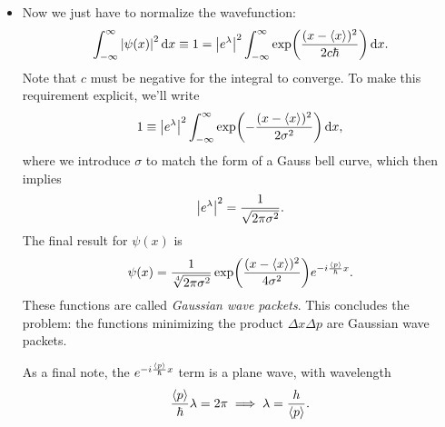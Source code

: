 \documentclass[11pt, a4paper]{article}
\newcommand{\diff}{\mathop{}\!\mathrm{d}} %
\begin{document}
\begin{itemize}
	\item Now we just have to normalize the wavefunction:
	\begin{equation*}
		\int_{-\infty}^{\infty} \abs{\psi(x)}^{2} \diff x \equiv 1 = \abs{e^{\lambda}}^{2} \int_{-\infty}^{\infty}\exp(\frac{(x - \ev{x})^{2}}{2c\hbar})\diff x.
	\end{equation*}
	Note that $ c $ must be negative for the integral to converge. To make this requirement explicit, we'll write
	\begin{equation*}
		1 \equiv  \abs{e^{\lambda}}^{2} \int_{-\infty}^{\infty}\exp(-\frac{(x - \ev{x})^{2}}{2\sigma^{2}})\diff x,
	\end{equation*}
	where we introduce $ \sigma $ to match the form of a Gauss bell curve, which then implies
	\begin{equation*}
		\abs{e^{\lambda}}^{2} = \frac{1}{\sqrt{2\pi \sigma^{2}}}.
	\end{equation*}
	The final result for $ \psi(x) $ is
	\begin{equation*}
		\psi(x) = \frac{1}{\sqrt[4]{2\pi \sigma^{2}}} \exp(\frac{(x - \ev{x})^{2}}{4 \sigma^{2}})e^{-i\frac{\ev{p}}{\hbar}x}.
	\end{equation*}
	These functions are called \textit{Gaussian wave packets}. This concludes the problem: the functions minimizing the product $ \Delta x \Delta p $ are Gaussian wave packets. 
	
	As a final note, the $ e^{-i\frac{\ev{p}}{\hbar}x} $ term is a plane wave, with wavelength
	\begin{equation*}
		\frac{\ev{p}}{\hbar} \lambda = 2\pi \implies \lambda = \frac{h}{\ev{p}}.
	\end{equation*}
	
\end{itemize}
\end{document}
